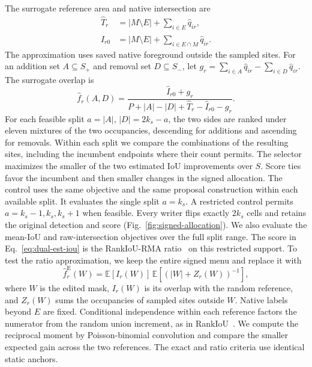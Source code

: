 \documentclass[journal]{IEEEtran}
\begin{document}
The surrogate reference area and native intersection are
\begin{equation}
\begin{aligned}
 \hat T_r&=|M\setminus E|+\sum_{i\in E}\hat q_{ir},\\
 \hat I_{r0}&=|M\setminus E|+\sum_{i\in E\cap M}\hat q_{ir}.
\end{aligned}
\label{eq:dual-area-proxy}
\end{equation}
The approximation uses saved native foreground outside the sampled sites. For an addition set \(A\subseteq S_+\) and removal set \(D\subseteq S_-\), let \(g_r=\sum_{i\in A}\hat q_{ir}-\sum_{i\in D}\hat q_{ir}\). The surrogate overlap is
\begin{equation}
 \hat f_r(A,D)=
 \frac{\hat I_{r0}+g_r}{P+|A|-|D|+\hat T_r-\hat I_{r0}-g_r}.
 \label{eq:dual-est-iou}
\end{equation}
For each feasible split \(a=|A|\), \(|D|=2k_s-a\), the two sides are ranked under eleven mixtures of the two occupancies, descending for additions and ascending for removals. Within each split we compare the combinations of the resulting sites, including the incumbent endpoints where their count permits. The selector maximizes the smaller of the two estimated IoU improvements over \(S\). Score ties favor the incumbent and then smaller changes in the signed allocation. The control uses the same objective and the same proposal construction within each available split. It evaluates the single split \(a=k_s\). A restricted control permits \(a=k_s-1,k_s,k_s+1\) when feasible. Every writer flips exactly \(2k_s\) cells and retains the original detection and score (Fig.~\ref{fig:signed-allocation}). We also evaluate the mean-IoU and raw-intersection objectives over the full split range. The score in Eq.~\eqref{eq:dual-est-iou} is the RankIoU-RMA ratio~\cite{rankrma} on this restricted support. To test the ratio approximation, we keep the entire signed menu and replace it with
\begin{equation}
 \hat f^{\mathrm{E}}_r(W)=\mathbb{E}[I_r(W)]\,
     \mathbb{E}\!\left[(|W|+Z_r(W))^{-1}\right],
 \label{eq:exact-iou-signed}
\end{equation}
where \(W\) is the edited mask, \(I_r(W)\) is its overlap with the random reference, and \(Z_r(W)\) sums the occupancies of sampled sites outside \(W\). Native labels beyond \(E\) are fixed. Conditional independence within each reference factors the numerator from the random union increment, as in RankIoU~\cite{rankseg}. We compute the reciprocal moment by Poisson-binomial convolution and compare the smaller expected gain across the two references. The exact and ratio criteria use identical static anchors.
\end{document}
